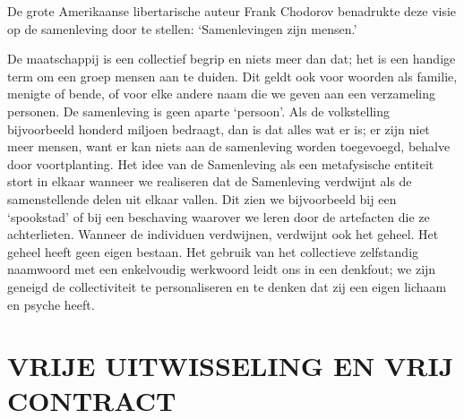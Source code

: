 \documentclass[
  a5paper,
  smalldemyvopaper,10pt,twoside,onecolumn,openright,extrafontsizes,hidelinks]{memoir}
\renewenvironment{quote}%
               {\list{}{\rightmargin=.6cm\leftmargin=.6cm}%
                \itshape \item[]}%
               {\endlist}
\begin{document}
De grote Amerikaanse libertarische auteur Frank Chodorov benadrukte deze
visie op de samenleving door te stellen: `Samenlevingen zijn mensen.'

\begin{quote}
De maatschappij is een collectief begrip en niets meer dan dat; het is
een handige term om een groep mensen aan te duiden. Dit geldt ook voor
woorden als familie, menigte of bende, of voor elke andere naam die we
geven aan een verzameling personen. De samenleving is geen aparte
`persoon'. Als de volkstelling bijvoorbeeld honderd miljoen bedraagt,
dan is dat alles wat er is; er zijn niet meer mensen, want er kan niets
aan de samenleving worden toegevoegd, behalve door voortplanting. Het
idee van de Samenleving als een metafysische entiteit stort in elkaar
wanneer we realiseren dat de Samenleving verdwijnt als de samenstellende
delen uit elkaar vallen. Dit zien we bijvoorbeeld bij een `spookstad' of
bij een beschaving waarover we leren door de artefacten die ze
achterlieten. Wanneer de individuen verdwijnen, verdwijnt ook het
geheel. Het geheel heeft geen eigen bestaan. Het gebruik van het
collectieve zelfstandig naamwoord met een enkelvoudig werkwoord leidt
ons in een denkfout; we zijn geneigd de collectiviteit te personaliseren
en te denken dat zij een eigen lichaam en psyche heeft.
\end{quote}

\section{\texorpdfstring{\textbf{VRIJE UITWISSELING EN VRIJ
CONTRACT}}{VRIJE UITWISSELING EN VRIJ CONTRACT}}\label{vrije-uitwisseling-en-vrij-contract}
\end{document}
